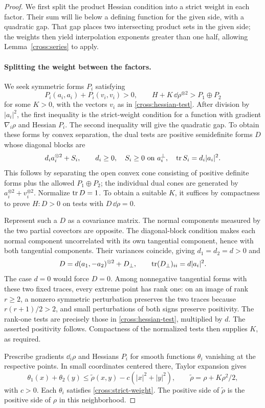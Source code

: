 \begin{proof}
We first split the product Hessian condition into a strict weight in
each factor. Their sum will lie below a defining function for the given
side, with a quadratic gap. That gap places two intersecting product
sets in the given side; the weights then yield interpolation exponents
greater than one half, allowing Lemma~\ref{cross:series} to apply.

\paragraph{Splitting the weight between the factors.}
We seek symmetric forms $P_i$ satisfying
\[
 P_i(a_i,a_i)+P_i(v_i,v_i)>0,
 \qquad H+K\,\dd\rho^{\otimes2}>P_1\oplus P_2
\]
for some $K>0$, with the vectors $v_i$ as in
\eqref{cross:hessian-test}. After division by $|a_i|^2$, the first
inequality is the strict-weight condition for a function with gradient
$\nabla_i\rho$ and Hessian $P_i$. The second inequality will give the
quadratic gap. To obtain these forms by convex separation, the dual
tests are positive semidefinite forms $D$ whose diagonal blocks are
\[
 d_i a_i^{\otimes2}+S_i,\qquad
 d_i\ge0,\quad S_i\ge0\text{ on }a_i^\perp,
 \quad \operatorname{tr} S_i=d_i|a_i|^2.
\]
This follows by separating the open convex cone consisting of positive
definite forms plus the allowed $P_1\oplus P_2$; the individual dual
cones are generated by $a_i^{\otimes2}+v_i^{\otimes2}$.
Normalize $\operatorname{tr} D=1$.  To obtain a suitable $K$, it suffices by
compactness to prove $H:D>0$ on tests with $D\,\dd\rho=0$.

Represent such a $D$ as a covariance matrix.  The normal components
measured by the two partial covectors are opposite.  The diagonal-block
condition makes each normal component uncorrelated with its own
tangential component, hence with both tangential components.
Their variances coincide, giving $d_1=d_2=d>0$ and
\[
 D=d(a_1,-a_2)^{\otimes2}+D_\perp,
 \qquad \operatorname{tr}(D_\perp)_{ii}=d|a_i|^2.
\]
The case $d=0$ would force $D=0$.  Among nonnegative tangential forms
with these two fixed traces, every extreme point has rank one:
on an image of rank $r\ge2$, a nonzero symmetric perturbation preserves
the two traces because $r(r+1)/2>2$, and small perturbations of both
signs preserve positivity.  The rank-one tests are precisely those
in \eqref{cross:hessian-test}, multiplied by $d$.
The asserted positivity follows.  Compactness of the normalized tests
then supplies $K$, as required.

Prescribe gradients $\dd_i\rho$ and Hessians $P_i$ for smooth functions
$\theta_i$ vanishing at the respective points.  In small coordinates
centered there, Taylor expansion gives
\begin{equation}\label{cross:quadratic-gap}
 \theta_1(x)+\theta_2(y)
 \le \widetilde\rho(x,y)-c(|x|^2+|y|^2),
 \qquad \widetilde\rho=\rho+K\rho^2/2,
\end{equation}
with $c>0$.  Each $\theta_i$ satisfies
\eqref{cross:strict-weight}.  The positive side of $\widetilde\rho$
is the positive side of $\rho$ in this neighborhood.


\end{proof}

